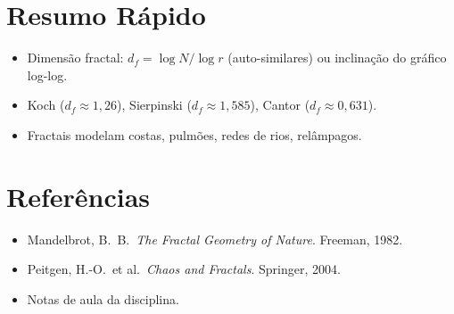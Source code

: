 \documentclass[12pt,a4paper]{article}
\begin{document}
\section*{Resumo R\'apido}
\begin{itemize}
  \item Dimens\~ao fractal: $d_f = \log N / \log r$ (auto-similares) ou inclina\c{c}\~ao do gr\'afico log-log.
  \item Koch ($d_f\approx1{,}26$), Sierpinski ($d_f\approx1{,}585$), Cantor ($d_f\approx0{,}631$).
  \item Fractais modelam costas, pulm\~oes, redes de rios, rel\^ampagos.
\end{itemize}

\section*{Refer\^encias}
\begin{itemize}
  \item Mandelbrot, B.\ B.\ \textit{The Fractal Geometry of Nature}. Freeman, 1982.
  \item Peitgen, H.-O.\ et al.\ \textit{Chaos and Fractals}. Springer, 2004.
  \item Notas de aula da disciplina.
\end{itemize}
\end{document}
